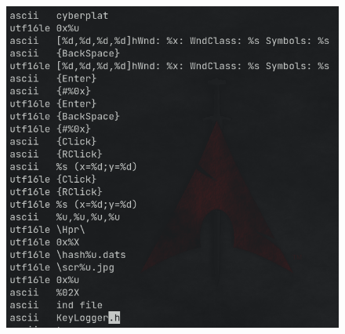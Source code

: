 \documentclass[10pt,a4paper]{article}
\begin{document}
	\begin{figure}[!htbp]%
		\centering
		\includegraphics[width=\columnwidth]{pics/sus15.png}
	\end{figure}

\newpage
\printbibliography
\end{document}

